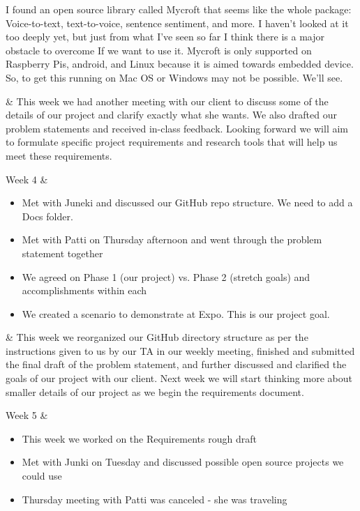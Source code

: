 \documentclass[onecolumn, draftclsnofoot,10pt, compsoc]{IEEEtran}
\begin{document}
\begin{center}
\begin{longtabu}
{				I found an open source library called Mycroft that seems like the whole package: Voice-to-text, text-to-voice, sentence sentiment, and more. I haven't looked at it too deeply yet, but just from what I've seen so far I think there is a major obstacle to overcome If we want to use it. Mycroft is only supported on Raspberry Pis, android, and Linux because it is aimed towards embedded device. So, to get this running on Mac OS or Windows may not be possible. We'll see.
			}

 			&
			{
				This week we had another meeting with our client to discuss some of the details of our project and clarify exactly what she wants.
				We also drafted our problem statements and received in-class feedback.
				Looking forward we will aim to formulate specific project requirements and research tools that will help us meet these requirements.
			}
			\\ \hline

			Week 4
			&
			{
				\begin{itemize}
					\item Met with Juneki and discussed our GitHub repo structure. We need to add a Docs folder.
					\item Met with Patti on Thursday afternoon and went through the problem statement together
					\item We agreed on Phase 1 (our project) vs. Phase 2 (stretch goals) and accomplishments within each
					\item We created a scenario to demonstrate at Expo. This is our project goal.
				\end{itemize}
			}

			&
			{
				This week we reorganized our GitHub directory structure as per the instructions given to us by our TA in our weekly meeting, finished and submitted the final draft of the problem statement, and further discussed and clarified the goals of our project with our client.
				Next week we will start thinking more about smaller details of our project as we begin the requirements document.
			}
			\\ \hline

			Week 5
			&
			{
				\begin{itemize}
					\item This week we worked on the Requirements rough draft
					\item Met with Junki on Tuesday and discussed possible open source projects we could use
					\item Thursday meeting with Patti was canceled - she was traveling
				\end{itemize}
			}


\end{longtabu}
\end{center}
\end{document}
